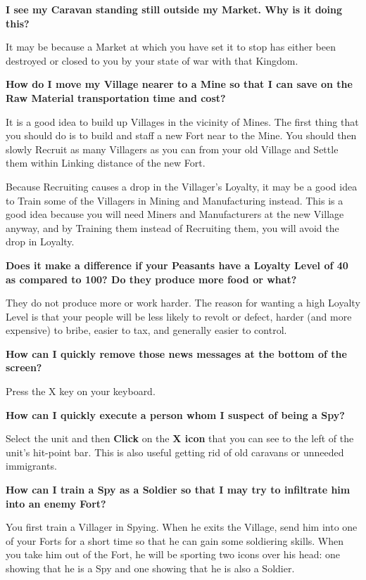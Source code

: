 {\large \textbf{\textsf{I see my Caravan standing still outside my Market. Why is it doing this?}}}

It may be because a Market at which you have set it to stop has either been destroyed or closed to you by your state of war with that Kingdom.

{\large \textbf{\textsf{How do I move my Village nearer to a Mine so that I can save on the Raw Material transportation time and cost?}}}

It is a good idea to build up Villages in the vicinity of Mines. The first thing that you should do is to build and staff a new Fort near to the Mine. You should then slowly Recruit as many Villagers as you can from your old Village and Settle them within Linking distance of the new Fort.

Because Recruiting causes a drop in the Villager’s Loyalty, it may be a good idea to Train some of the Villagers in Mining and Manufacturing instead. This is a good idea because you will need Miners and Manufacturers at the new Village anyway, and by Training them instead of Recruiting them, you will avoid the drop in Loyalty.

{\large \textbf{\textsf{Does it make a difference if your Peasants have a Loyalty Level of 40 as compared to 100? Do they produce more food or what?}}}

They do not produce more or work harder. The reason for wanting a high Loyalty Level is that your people will be less likely to revolt or defect, harder (and more expensive) to bribe, easier to tax, and generally easier to control.

{\large \textbf{\textsf{How can I quickly remove those news messages at the bottom of the screen?}}}


Press the X key on your keyboard.

{\large \textbf{\textsf{How can I quickly execute a person whom I suspect of being a Spy?}}}


Select the unit and then \textbf{Click} on the \textbf{X icon} that you can see to the left of the unit’s hit-point bar. This is also useful getting rid of old caravans or unneeded immigrants.

{\large \textbf{\textsf{How can I train a Spy as a Soldier so that I may try to infiltrate him into an enemy Fort?}}}

You first train a Villager in Spying. When he exits the Village, send him into one of your Forts for a short time so that he can gain some soldiering skills. When you take him out of the Fort, he will be sporting two icons over his head: one showing that he is a Spy and one showing that he is also a Soldier.